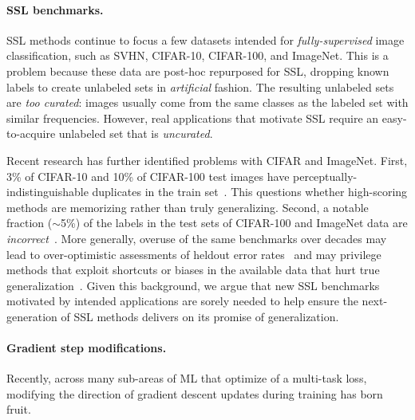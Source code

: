 \paragraph{SSL benchmarks.}
SSL methods continue to focus a few datasets intended for \emph{fully-supervised} image classification, such as SVHN, CIFAR-10, CIFAR-100, and ImageNet.
This is a problem because these data are post-hoc repurposed for SSL, dropping known labels to create unlabeled sets in \emph{artificial} fashion.
The resulting unlabeled sets are \emph{too curated}: images usually come from the same classes as the labeled set with similar frequencies.
However, real applications that motivate SSL require an easy-to-acquire unlabeled set that is \emph{uncurated}. 

Recent research has further identified problems with CIFAR and ImageNet.
First, 3\% of CIFAR-10 and 10\% of CIFAR-100 test images have perceptually-indistinguishable duplicates in the train set~\citep{barzWeTrainTest2020}.
This questions whether high-scoring methods are memorizing rather than truly generalizing.
Second, a notable fraction ($\sim$5\%) of the labels in the test sets of CIFAR-100 and ImageNet data are \emph{incorrect}~\citep{northcuttPervasiveLabelErrors2021}.
More generally, overuse of the same benchmarks over decades may lead to over-optimistic assessments of heldout error rates~\citep{yadavColdCaseLost2019} and may privilege methods that exploit shortcuts or biases in the available data that hurt true generalization~\citep{tsiprasImageNetImageClassification2020,geirhosShortcutLearningDeep2020}.
Given this background, we argue that new SSL benchmarks motivated by intended applications are sorely needed to help ensure the next-generation of SSL methods delivers on its promise of generalization.

\paragraph{Gradient step modifications.} Recently, across many sub-areas of ML that optimize of a multi-task loss, modifying the direction of gradient descent updates during training has born fruit.

